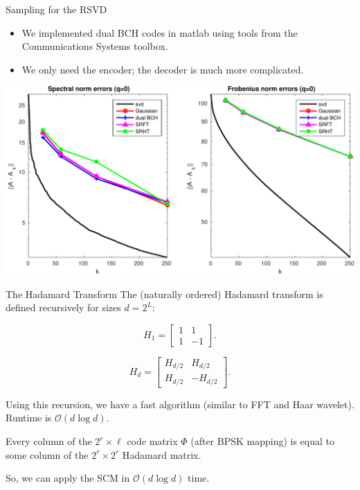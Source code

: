 \documentclass[9pt]{beamer}
\begin{document}
\begin{frame}{Sampling for the RSVD}
   \begin{itemize}
      \item We implemented dual BCH codes in {\sc matlab} using tools from the Communications Systems toolbox.\\
      \item We only need the encoder; the decoder is much more complicated.
   \end{itemize}
   
   \begin{center}
      \includegraphics[width=\textwidth]{figures/kohonen_rsvd_compare_trim.pdf}
   \end{center}
\end{frame}


\begin{frame}{The Hadamard Transform}
   The (naturally ordered) Hadamard transform is defined recursively for sizes $d=2^L$:

   \[ H_1 = \begin{bmatrix}1 &1\\1&-1\end{bmatrix}. \] 
   
   \[ H_d = \begin{bmatrix} H_{d/2} & H_{d/2}\\H_{d/2} & -H_{d/2}\end{bmatrix}. \] 
   
   \noindent Using this recursion, we have a fast algorithm (similar to FFT and Haar wavelet).\\
   \noindent Runtime is $\mathcal{O}(d\log d)$.\\[2em]
   
   \begin{theorem}
      Every column of the $2^r\times \ell$ code matrix $\Phi$ (after BPSK mapping) is equal to some column of the $2^r\times 2^r$ Hadamard matrix.
   \end{theorem}
   
   So, we can apply the SCM in $\mathcal{O}(d\log d)$ time.
\end{frame}
\end{document}
